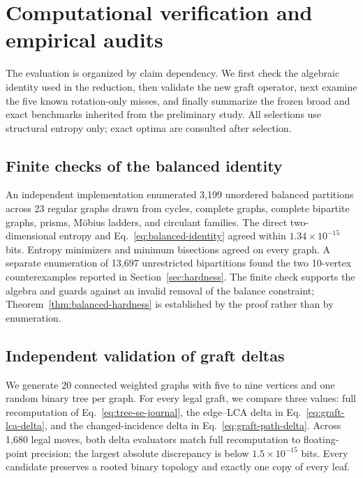 \section{Computational verification and empirical audits}
\label{sec:experiments}

The evaluation is organized by claim dependency. We first check the algebraic
identity used in the reduction, then validate the new graft operator, next
examine the five known rotation-only misses, and finally summarize the frozen
broad and exact benchmarks inherited from the preliminary study. All
selections use structural entropy only; exact optima are consulted after
selection.

\subsection{Finite checks of the balanced identity}

An independent implementation enumerated 3,199 unordered balanced partitions
across 23 regular graphs drawn from cycles, complete graphs, complete
bipartite graphs, prisms, M\"obius ladders, and circulant families. The direct
two-dimensional entropy and Eq.~\eqref{eq:balanced-identity} agreed within
$1.34\times10^{-15}$ bits. Entropy minimizers and minimum bisections agreed on
every graph. A separate enumeration of 13,697 unrestricted bipartitions found
the two 10-vertex counterexamples reported in Section~\ref{sec:hardness}. The
finite check supports the algebra and guards against an invalid removal of the
balance constraint; Theorem~\ref{thm:balanced-hardness} is established by the
proof rather than by enumeration.

\subsection{Independent validation of graft deltas}\label{sec:graft-validation}

We generate 20 connected weighted graphs with five to nine vertices and one
random binary tree per graph. For every legal graft, we compare three values:
full recomputation of Eq.~\eqref{eq:tree-se-journal}, the edge--LCA delta in
Eq.~\eqref{eq:graft-lca-delta}, and the changed-incidence delta in
Eq.~\eqref{eq:graft-path-delta}. Across 1,680 legal moves, both delta evaluators
match full recomputation to floating-point precision; the largest absolute
discrepancy is below $1.5\times10^{-15}$ bits. Every candidate preserves a
rooted binary topology and exactly one copy of every leaf.

